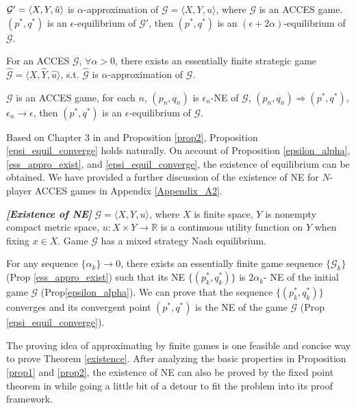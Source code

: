 \begin{proposition}\label{epsilon_alpha} {}
    $\mathcal{G}'=\langle X, Y, \Tilde{u} \rangle$ is $\alpha$-approximation of $\mathcal{G}=\langle X, Y, u \rangle$, where $\mathcal{G}$ is an ACCES game. $(p^*, q^*)$ is an $\epsilon$-equilibrium of $\mathcal{G}'$, then $(p^*, q^*)$ is an $(\epsilon + 2\alpha)$-equilibrium of $\mathcal{G}$.
\end{proposition}

\begin{proposition}\label{ess_appro_exist} {}
    For an ACCES $\mathcal{G}$, $\forall \alpha >0$, there exists an essentially finite strategic game $\hat{\mathcal{G}}=\langle X, \hat{Y}, \hat{u}\rangle$, s.t. $\hat{\mathcal{G}}$ is $\alpha$-approximation of $\mathcal{G}$.
\end{proposition}

\begin{proposition}\label{epsi_equil_converge} {}
    $\mathcal{G}$ is an ACCES game, for each $n$, $(p_n, q_n)$ is $\epsilon_n$-NE of $\mathcal{G}$, $(p_n, q_n) \Rightarrow (p^*, q^*)$, $\epsilon_n \rightarrow \epsilon$, then $(p^*, q^*)$ is an $\epsilon$-equilibrium of $\mathcal{G}$.
\end{proposition}

Based on Chapter 3 in \cite{Myerson1991GameT} and Proposition \ref{prop2}, Proposition \ref{epsi_equil_converge} holds naturally. On account of Proposition \ref{epsilon_alpha}, \ref{ess_appro_exist}, and \ref{epsi_equil_converge}, the existence of equilibrium can be obtained. We have provided a further discussion of the existence of NE for $N$-player ACCES games in Appendix \ref{Appendix_A2}.

\begin{theorem}\label{existence} \textbf{\emph{[Existence of NE]}}
    $\mathcal{G}=\langle X, Y, u \rangle$, where $X$ is finite space, $Y$ is nonempty compact metric space, $u: X \times Y \rightarrow \mathbb{R}$ is a continuous utility function on $Y$ when fixing $x \in X$. Game $\mathcal{G}$ has a mixed strategy Nash equilibrium.
\end{theorem}
\begin{proof-sketch}
    For any sequence $\{\alpha_k\} \rightarrow 0$, there exists an essentially finite game sequence $\{\mathcal{G}_k\}$ (Prop \ref{ess_appro_exist}) such that its NE $\{(p_k^*, q_k^*)\}$ is $2\alpha_k$- NE of the initial game $\mathcal{G}$ (Prop\ref{epsilon_alpha}). We can prove that the sequence $\{(p_k^*, q_k^*)\}$ converges and its convergent point $(p^*, q^*)$ is the NE of the game $\mathcal{G}$ (Prop \ref{epsi_equil_converge}).
\end{proof-sketch}

\begin{remark}
    The proving idea of approximating by finite games is one feasible and concise way to prove Theorem \ref{existence}. After analyzing the basic properties in Proposition \ref{prop1} and \ref{prop2}, the existence of NE can also be proved by the fixed point theorem in \citep{glicksberg1952further} while going a little bit of a detour to fit the problem into its proof framework. 
\end{remark}
